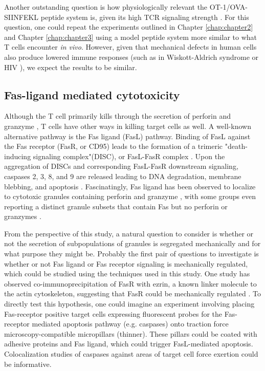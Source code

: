 Another outstanding question is how physiologically relevant the OT-1/OVA-SIINFEKL peptide system is, given its high TCR signaling strength \cite{Moran2011}. For this question, one could repeat the experiments outlined in Chapter \ref{chap:chapter2} and Chapter \ref{chap:chapter3} using a model peptide system more similar to what T cells encounter \textit{in vivo}. However, given that mechanical defects in human cells also produce lowered immune responses (such as in Wiskott-Aldrich syndrome or HIV \cite{Houmadi2018}), we expect the results to be similar.

\subsection{Fas-ligand mediated cytotoxicity}

Although the T cell primarily kills through the secretion of perforin and granzyme \cite{Yasukawa2000}, T cells have other ways in killing target cells as well. A well-known alternative pathway is the Fas ligand (FasL) pathway.  Binding of FasL against the Fas receptor (FasR, or CD95) leads to the formation of a trimeric "death-inducing signaling complex"(DISC), or FasL-FasR complex \cite{Yamada2017}. Upon the aggregation of DISCs and corresponding FasL-FasR downstream signaling, caspases 2, 3, 8, and 9 are released leading to DNA degradation, membrane blebbing, and apoptosis \cite{Parlato2000, Yamada2017}. Fascinatingly, Fas ligand has been observed to localize to cytotoxic granules containing perforin and granzyme \cite{Kojima2002}, with some groups even reporting a distinct granule subsets that contain Fas but no perforin or granzymes \cite{Chang2017, Schmidt2011, Schmidt2011_2}. 

From the perspective of this study, a natural question to consider is whether or not the secretion of subpopulations of granules is segregated mechanically and for what purpose they might be. Probably the first pair of questions to investigate is whether or not Fas ligand or Fas receptor signaling is mechanically regulated, which could be studied using the techniques used in this study. One study has observed co-immunoprecipitation of FasR with ezrin, a known linker molecule to the actin cytoskeleton, suggesting that FasR could be mechanically regulated \cite{Parlato2000}. To directly test this hypothesis, one could imagine an experiment involving placing Fas-receptor positive target cells expressing fluorescent probes for the Fas-receptor mediated apoptosis pathway (e.g. caspases) onto traction force microscopy-compatible micropillars (thinner). These pillars could be coated with adhesive proteins and Fas ligand, which could trigger FasL-mediated apoptosis. Colocalization studies of caspases against areas of target cell force exertion could be informative.

